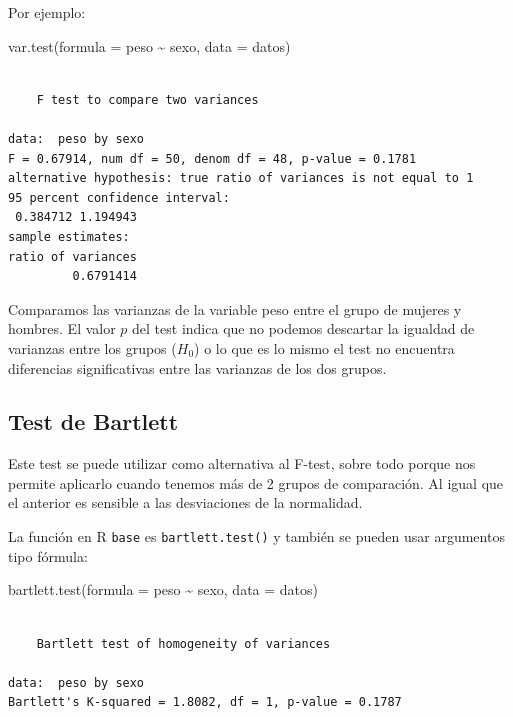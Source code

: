 \documentclass[
  spanish,
  a4paper,
]{scrbook}
\newenvironment{Shaded}{\begin{snugshade}}{\end{snugshade}}
\newcommand{\AttributeTok}[1]{\textcolor[rgb]{0.40,0.45,0.13}{#1}}
\newcommand{\FunctionTok}[1]{\textcolor[rgb]{0.28,0.35,0.67}{#1}}
\newcommand{\NormalTok}[1]{\textcolor[rgb]{0.00,0.23,0.31}{#1}}
\newcommand{\SpecialCharTok}[1]{\textcolor[rgb]{0.37,0.37,0.37}{#1}}
\begin{document}
Por ejemplo:

\begin{Shaded}
\begin{Highlighting}[]
\FunctionTok{var.test}\NormalTok{(}\AttributeTok{formula =}\NormalTok{ peso }\SpecialCharTok{\textasciitilde{}}\NormalTok{ sexo, }\AttributeTok{data =}\NormalTok{ datos)}
\end{Highlighting}
\end{Shaded}

\begin{verbatim}

    F test to compare two variances

data:  peso by sexo
F = 0.67914, num df = 50, denom df = 48, p-value = 0.1781
alternative hypothesis: true ratio of variances is not equal to 1
95 percent confidence interval:
 0.384712 1.194943
sample estimates:
ratio of variances 
         0.6791414 
\end{verbatim}

Comparamos las varianzas de la variable peso entre el grupo de mujeres y
hombres. El valor \(p\) del test indica que no podemos descartar la
igualdad de varianzas entre los grupos (\(H_0\)) o lo que es lo mismo el
test no encuentra diferencias significativas entre las varianzas de los
dos grupos.

\subsection{Test de Bartlett}\label{test-de-bartlett}

Este test se puede utilizar como alternativa al F-test, sobre todo
porque nos permite aplicarlo cuando tenemos más de 2 grupos de
comparación. Al igual que el anterior es sensible a las desviaciones de
la normalidad.

La función en R \texttt{base} es \texttt{bartlett.test()} y también se
pueden usar argumentos tipo fórmula:

\begin{Shaded}
\begin{Highlighting}[]
\FunctionTok{bartlett.test}\NormalTok{(}\AttributeTok{formula =}\NormalTok{ peso }\SpecialCharTok{\textasciitilde{}}\NormalTok{ sexo, }\AttributeTok{data =}\NormalTok{ datos)}
\end{Highlighting}
\end{Shaded}

\begin{verbatim}

    Bartlett test of homogeneity of variances

data:  peso by sexo
Bartlett's K-squared = 1.8082, df = 1, p-value = 0.1787
\end{verbatim}
\end{document}

